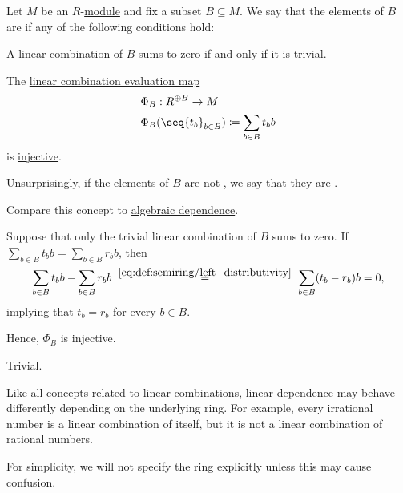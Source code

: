 \begin{definition}\label{def:linear_dependence}\mimprovised
  Let \( M \) be an \( R \)-\hyperref[def:module]{module} and fix a subset \( B \subseteq M \). We say that the elements of \( B \) are  if any of the following conditions hold:

  \begin{thmenum}
     A \hyperref[rem:linear_combinations]{linear combination} of \( B \) sums to zero if and only if it is \hyperref[rem:linear_combinations/trivial]{trivial}.

     The \hyperref[thm:free_semimodule_universal_property]{linear combination evaluation map}
    \begin{equation*}
      \begin{aligned}
        &\Phi_B: R^{\oplus B} \to M \\
        &\Phi_B( \seq{ t_b }_{b \in B} ) \coloneqq \sum_{b \in B} t_b b
      \end{aligned}
    \end{equation*}
    is \hyperref[def:function_invertibility/injective]{injective}.
  \end{thmenum}

  Unsurprisingly, if the elements of \( B \) are not , we say that they are .

  Compare this concept to \hyperref[def:algebraic_dependence]{algebraic dependence}.
\end{definition}
\begin{defproof}
   Suppose that only the trivial linear combination of \( B \) sums to zero. If \( \sum_{b \in B} t_b b = \sum_{b \in B} r_b b \), then
  \begin{equation*}
    \sum_{b \in B} t_b b - \sum_{b \in B} r_b b
    \reloset {\eqref{eq:def:semiring/left_distributivity}} =
    \sum_{b \in B} (t_b - r_b) b
    =
    0,
  \end{equation*}
  implying that \( t_b = r_b \) for every \( b \in B \).

  Hence, \( \Phi_B \) is injective.

   Trivial.
\end{defproof}

\begin{remark}\label{rem:linear_dependence_base_ring}
  Like all concepts related to \hyperref[rem:linear_combinations]{linear combinations}, linear dependence may behave differently depending on the underlying ring. For example, every irrational number is a linear combination of itself, but it is not a linear combination of rational numbers.

  For simplicity, we will not specify the ring explicitly unless this may cause confusion.
\end{remark}

